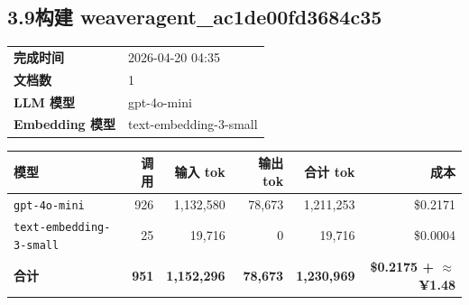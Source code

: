 \documentclass[11pt]{article}
\begin{document}
\subsection*{3.9\;构建 weaveragent\_ac1de00fd3684c35}
\noindent\begin{minipage}{\textwidth}
\begin{tabular}{@{}ll@{}}
\textbf{完成时间} & 2026-04-20 04:35 \\
\textbf{文档数} & 1 \\
\textbf{LLM 模型} & gpt-4o-mini \\
\textbf{Embedding 模型} & text-embedding-3-small \\
\end{tabular}
\end{minipage}
\par\vspace{0.25cm}
\noindent\begin{tabularx}{\textwidth}{@{}X r r r r r@{}}
\toprule
\rowcolor{headerbg!10}\textbf{模型} & \textbf{调用} & \textbf{输入 tok} & \textbf{输出 tok} & \textbf{合计 tok} & \textbf{成本} \\
\midrule
\rowcolor{rowalt}\texttt{\small gpt-4o-mini} & 926 & 1{,}132{,}580 & 78{,}673 & 1{,}211{,}253 & \$0.2171 \\
\texttt{\small text-embedding-3-small} & 25 & 19{,}716 & 0 & 19{,}716 & \$0.0004 \\
\midrule
\rowcolor{headerbg!15}\textbf{合计} & \textbf{951} & \textbf{1{,}152{,}296} & \textbf{78{,}673} & \textbf{1{,}230{,}969} & \textbf{\$0.2175 + $\approx$ ¥1.48} \\
\bottomrule
\end{tabularx}
\vspace{0.5cm}
\end{document}
